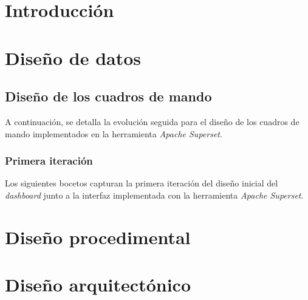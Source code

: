 
\section{Introducción}

\section{Diseño de datos}

\subsection{Diseño de los cuadros de mando}

A continuación, se detalla la evolución seguida para el diseño de los cuadros de mando implementados en la herramienta \textit{Apache Superset}.

\subsubsection{Primera iteración}

Los siguientes bocetos capturan la primera iteración del diseño inicial del \textit{dashboard} junto a la interfaz implementada con la herramienta \textit{Apache Superset}.







\section{Diseño procedimental}

\section{Diseño arquitectónico}


